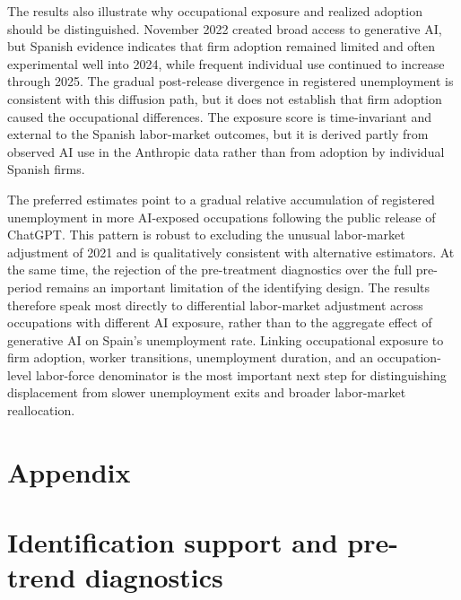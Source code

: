 \documentclass[11pt]{article}
\begin{document}
The results also illustrate why occupational exposure and realized adoption should be distinguished. November 2022 created broad access to generative AI, but Spanish evidence indicates that firm adoption remained limited and often experimental well into 2024, while frequent individual use continued to increase through 2025. The gradual post-release divergence in registered unemployment is consistent with this diffusion path, but it does not establish that firm adoption caused the occupational differences. The exposure score is time-invariant and external to the Spanish labor-market outcomes, but it is derived partly from observed AI use in the Anthropic data rather than from adoption by individual Spanish firms.

The preferred estimates point to a gradual relative accumulation of registered unemployment in more AI-exposed occupations following the public release of ChatGPT. This pattern is robust to excluding the unusual labor-market adjustment of 2021 and is qualitatively consistent with alternative estimators. At the same time, the rejection of the pre-treatment diagnostics over the full pre-period remains an important limitation of the identifying design. The results therefore speak most directly to differential labor-market adjustment across occupations with different AI exposure, rather than to the aggregate effect of generative AI on Spain's unemployment rate. Linking occupational exposure to firm adoption, worker transitions, unemployment duration, and an occupation-level labor-force denominator is the most important next step for distinguishing displacement from slower unemployment exits and broader labor-market reallocation.

\clearpage



\appendix

\setcounter{figure}{0}
\setcounter{table}{0}
\renewcommand{\thefigure}{\Alph{section}.\arabic{figure}}
\renewcommand{\thetable}{\Alph{section}.\arabic{table}}
\renewcommand{\theHfigure}{\Alph{section}.\arabic{figure}}
\renewcommand{\theHtable}{\Alph{section}.\arabic{table}}
\makeatletter
{}
\makeatother

\clearpage
\section*{Appendix}
\section{Identification support and pre-trend diagnostics}
\label{app:v1_support}
\end{document}
